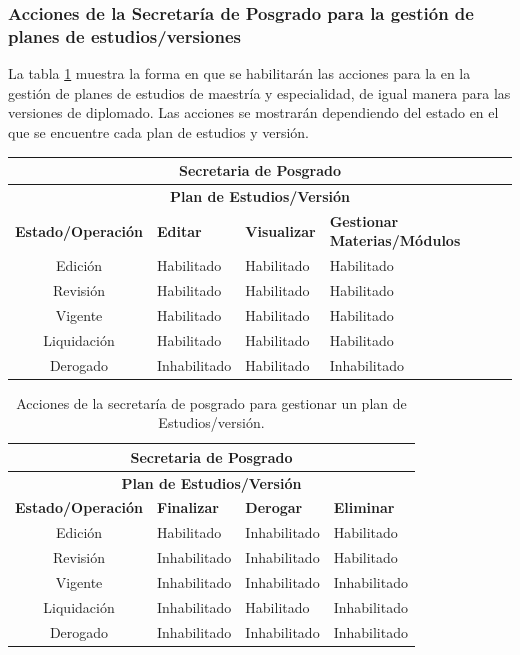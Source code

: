 \subsubsection{Acciones de la Secretaría de Posgrado para la gestión de planes de estudios/versiones}
La tabla \ref{tb:habilitarAccionesv}  muestra la forma en que se habilitarán las acciones para la  en la gestión de planes de estudios de maestría y especialidad, de igual manera para las versiones de diplomado. Las acciones se mostrarán dependiendo del estado en el que se encuentre cada plan de estudios y versión.\\
\begin{table}[htpb!] 
\centering
		\begin{tabular}{|c|l|l|l|}
			\hline
			\multicolumn{4}{|c|}{\textbf{Secretaria de Posgrado}} \\
			\hline
			\multicolumn{4}{|c|}{\textbf{Plan de Estudios/Versión}}
			\\ \hline \hline
			\textbf{Estado/Operación} & \textbf{Editar} & \textbf{Visualizar} & \textbf{Gestionar Materias/Módulos} \\ \hline \hline
			Edición & Habilitado & Habilitado & Habilitado \\ \hline
			Revisión & Habilitado & Habilitado & Habilitado \\ \hline
			Vigente & Habilitado & Habilitado & Habilitado \\ \hline
			Liquidación & Habilitado & Habilitado & Habilitado \\ \hline
			Derogado & Inhabilitado & Habilitado & Inhabilitado \\ \hline
		\end{tabular}

\end{table} 
		\begin{table}[htpb!] 

	\centering
	\begin{tabular}{|c|l|l|l|}
		\hline
		\multicolumn{4}{|c|}{\textbf{Secretaria de Posgrado}} \\
		\hline
		\multicolumn{4}{|c|}{\textbf{Plan de Estudios/Versión}}
		\\ \hline \hline
		\textbf{Estado/Operación} & \textbf{Finalizar} & \textbf{Derogar} & \textbf{Eliminar} \\ \hline \hline
		Edición & Habilitado & Inhabilitado & Habilitado \\ \hline
		Revisión & Inhabilitado & Inhabilitado & Habilitado \\ \hline
		Vigente & Inhabilitado & Inhabilitado & Inhabilitado \\ \hline
		Liquidación & Inhabilitado & Habilitado & Inhabilitado \\ \hline
		Derogado & Inhabilitado & Inhabilitado & Inhabilitado \\ \hline
	\end{tabular}
		\caption{Acciones de la secretaría de posgrado para gestionar un plan de Estudios/versión.}
		\hypertarget{tb:habilitarAccionesv}{}
		\label{tb:habilitarAccionesv}
\end{table}
